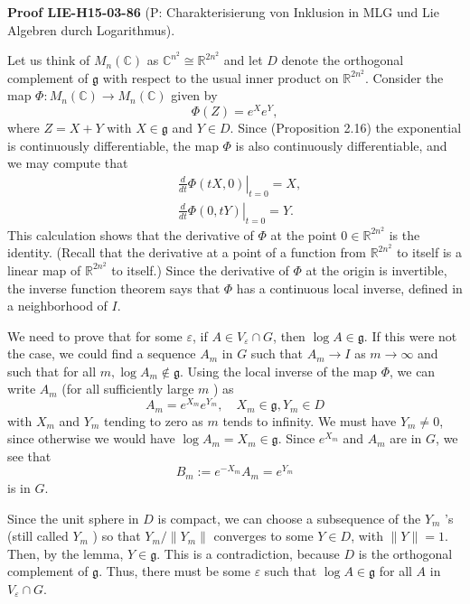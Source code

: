 \documentclass[10pt, letterpaper]{article}
\newcommand{\CustomHeading}[3]{%
  \par\medskip\noindent%
  \textbf{#1 #2} \textnormal{(#3)}.\enskip%
}
\newenvironment{PROOF}[2]{\begin{unitbox}\CustomHeading{Proof}{#1}{#2}}{\end{unitbox}}
\begin{document}
\begin{PROOF}{LIE-H15-03-86}{P: Charakterisierung von Inklusion in MLG und Lie Algebren durch Logarithmus}
Let us think of $M_{n}(\mathbb{C})$ as $\mathbb{C}^{n^{2}} \cong \mathbb{R}^{2 n^{2}}$ and let $D$ denote the orthogonal complement of $\mathfrak{g}$ with respect to the usual inner product on $\mathbb{R}^{2 n^{2}}$. Consider the map $\Phi: M_{n}(\mathbb{C}) \rightarrow M_{n}(\mathbb{C})$ given by
$$
\Phi(Z)=e^{X} e^{Y},
$$
where $Z=X+Y$ with $X \in \mathfrak{g}$ and $Y \in D$. Since (Proposition 2.16) the exponential is continuously differentiable, the map $\Phi$ is also continuously differentiable, and we may compute that
$$
\begin{aligned}
& \left.\frac{d}{d t} \Phi(t X, 0)\right|_{t=0}=X, \\
& \left.\frac{d}{d t} \Phi(0, t Y)\right|_{t=0}=Y .
\end{aligned}
$$
This calculation shows that the derivative of $\Phi$ at the point $0 \in \mathbb{R}^{2 n^{2}}$ is the identity. (Recall that the derivative at a point of a function from $\mathbb{R}^{2 n^{2}}$ to itself is a linear map of $\mathbb{R}^{2 n^{2}}$ to itself.) Since the derivative of $\Phi$ at the origin is invertible, the inverse function theorem says that $\Phi$ has a continuous local inverse, defined in a neighborhood of $I$.

We need to prove that for some $\varepsilon$, if $A \in V_{\varepsilon} \cap G$, then $\log A \in \mathfrak{g}$. If this were not the case, we could find a sequence $A_{m}$ in $G$ such that $A_{m} \rightarrow I$ as $m \rightarrow \infty$ and such that for all $m, \log A_{m} \notin \mathfrak{g}$. Using the local inverse of the map $\Phi$, we can write $A_{m}$ (for all sufficiently large $m$ ) as
$$
A_{m}=e^{X_{m}} e^{Y_{m}}, \quad X_{m} \in \mathfrak{g}, Y_{m} \in D
$$
with $X_{m}$ and $Y_{m}$ tending to zero as $m$ tends to infinity. We must have $Y_{m} \neq 0$, since otherwise we would have $\log A_{m}=X_{m} \in \mathfrak{g}$. Since $e^{X_{m}}$ and $A_{m}$ are in $G$, we see that
$$
B_{m}:=e^{-X_{m}} A_{m}=e^{Y_{m}}
$$
is in $G$.

Since the unit sphere in $D$ is compact, we can choose a subsequence of the $Y_{m}$ 's (still called $Y_{m}$ ) so that $Y_{m} /\left\|Y_{m}\right\|$ converges to some $Y \in D$, with $\|Y\|=1$. Then, by the lemma, $Y \in \mathfrak{g}$. This is a contradiction, because $D$ is the orthogonal complement of $\mathfrak{g}$. Thus, there must be some $\varepsilon$ such that $\log A \in \mathfrak{g}$ for all $A$ in $V_{\varepsilon} \cap G$.
\end{PROOF}
\end{document}

